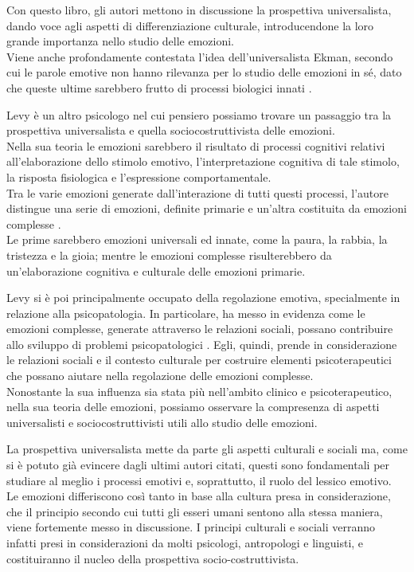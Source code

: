 Con questo libro, gli autori mettono in discussione la prospettiva universalista, dando voce agli aspetti di differenziazione culturale, introducendone la loro grande importanza nello studio delle emozioni.\\
Viene anche profondamente contestata l'idea dell'universalista Ekman, secondo cui le parole emotive non hanno rilevanza per lo studio delle emozioni in sé, dato che queste ultime sarebbero frutto di processi biologici innati \parencite{Wierzbicka}.

Levy è un altro psicologo nel cui pensiero possiamo trovare un passaggio tra la prospettiva universalista e quella sociocostruttivista delle emozioni.\\
Nella sua teoria le emozioni sarebbero il risultato di processi cognitivi relativi all'elaborazione dello stimolo emotivo, l'interpretazione cognitiva di tale stimolo, la risposta fisiologica e l'espressione comportamentale. \\
Tra le varie emozioni generate dall'interazione di tutti questi processi, l'autore distingue una serie di emozioni, definite primarie e un'altra costituita da emozioni complesse \parencite{levy_culture}.\\
Le prime sarebbero emozioni universali ed innate, come la paura, la rabbia, la tristezza e la gioia; mentre le emozioni complesse risulterebbero da un'elaborazione cognitiva e culturale delle emozioni primarie. 

Levy si è poi principalmente occupato della regolazione emotiva, specialmente in relazione alla psicopatologia. In particolare, ha messo in evidenza come le emozioni complesse, generate attraverso le relazioni sociali, possano contribuire allo sviluppo di problemi psicopatologici \parencite{levy_emotion_regulation}. Egli, quindi, prende in considerazione le relazioni sociali e il contesto culturale per costruire elementi psicoterapeutici che possano aiutare nella regolazione delle emozioni complesse. \\
Nonostante la sua influenza sia stata più nell'ambito clinico e psicoterapeutico, nella sua teoria delle emozioni, possiamo osservare la compresenza di aspetti universalisti e sociocostruttivisti utili allo studio delle emozioni. 

La prospettiva universalista mette da parte gli aspetti culturali e sociali ma, come si è potuto già evincere dagli ultimi autori citati, questi sono fondamentali per studiare al meglio i processi emotivi e, soprattutto, il ruolo del lessico emotivo.\\
Le emozioni differiscono così tanto in base alla  cultura presa in considerazione, che il principio secondo cui tutti gli esseri umani sentono alla stessa maniera, viene fortemente messo in discussione. I principi culturali e sociali verranno infatti presi in considerazioni da molti psicologi, antropologi e linguisti, e costituiranno il nucleo della prospettiva socio-costruttivista.

